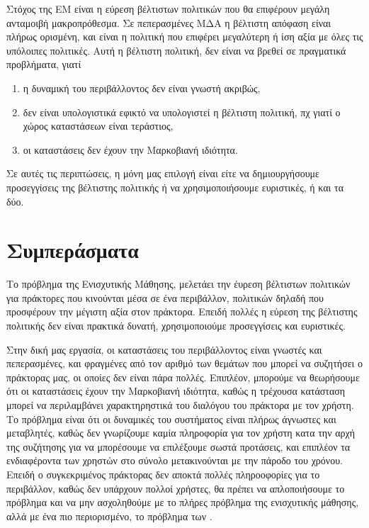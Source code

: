 Στόχος της ΕΜ είναι η εύρεση βέλτιστων πολιτικών που θα επιφέρουν μεγάλη ανταμοιβή μακροπρόθεσμα. Σε πεπερασμένες ΜΔΑ η βέλτιστη απόφαση είναι πλήρως ορισμένη, και είναι η πολιτική που επιφέρει μεγαλύτερη ή ίση αξία με όλες τις υπόλοιπες πολιτικές. Αυτή η βέλτιστη πολιτική, δεν είναι να βρεθεί σε πραγματικά προβλήματα, γιατί
\begin{enumerate}
    \item η δυναμική του περιβάλλοντος δεν είναι γνωστή ακριβώς,
    \item δεν είναι υπολογιστικά εφικτό να υπολογιστεί η βέλτιστη πολιτική, πχ γιατί ο χώρος καταστάσεων είναι τεράστιος,
    \item οι καταστάσεις δεν έχουν την Μαρκοβιανή ιδιότητα.
\end{enumerate}

Σε αυτές τις περιπτώσεις, η μόνη μας επιλογή είναι είτε να δημιουργήσουμε προσεγγίσεις της βέλτιστης πολιτικής ή να χρησιμοποιήσουμε ευριστικές, ή και τα δύο.

\section{Συμπεράσματα}

Το πρόβλημα της Ενισχυτικής Μάθησης, μελετάει την έυρεση βέλτιστων πολιτικών για πράκτορες που κινούνται μέσα σε ένα περιβάλλον, πολιτικών δηλαδή που προσφέρουν την μέγιστη αξία στον πράκτορα. Επειδή πολλές η εύρεση της βέλτιστης πολιτικής δεν είναι πρακτικά δυνατή, χρησιμοποιούμε προσεγγίσεις και ευριστικές.

Στην δική μας εργασία, οι καταστάσεις του περιβάλλοντος είναι γνωστές και πεπερασμένες, και φραγμένες από τον αριθμό των θεμάτων που μπορεί να συζητήσει ο πράκτορας μας, οι οποίες δεν είναι πάρα πολλές. Επιπλέον, μπορούμε να θεωρήσουμε ότι οι καταστάσεις έχουν την Μαρκοβιανή ιδιότητα, καθώς η τρέχουσα κατάσταση μπορεί να περιλαμβάνει χαρακτηρηστικά του διαλόγου του πράκτορα με τον χρήστη. Το πρόβλημα είναι ότι οι δυναμικές του συστήματος είναι πλήρως άγνωστες και μεταβλητές, καθώς δεν γνωρίζουμε καμία πληροφορία για τον χρήστη κατα την αρχή της συζήτησης για να μπορέσουμε να επιλέξουμε σωστά προτάσεις, και επιπλέον τα ενδιαφέροντα των χρηστών στο σύνολο μετακινούνται με την πάροδο του χρόνου. Επειδή ο συγκεκριμένος πράκτορας δεν αποκτά πολλές πληροοφορίες για το περιβάλλον, καθώς δεν υπάρχουν πολλοί χρήστες, θα πρέπει να απλοποιήσουμε το πρόβλημα και να μην ασχοληθούμε με το πλήρες πρόβλημα της ενισχυτικής μάθησης, αλλά με ένα πιο περιορισμένο, το πρόβλημα των .
